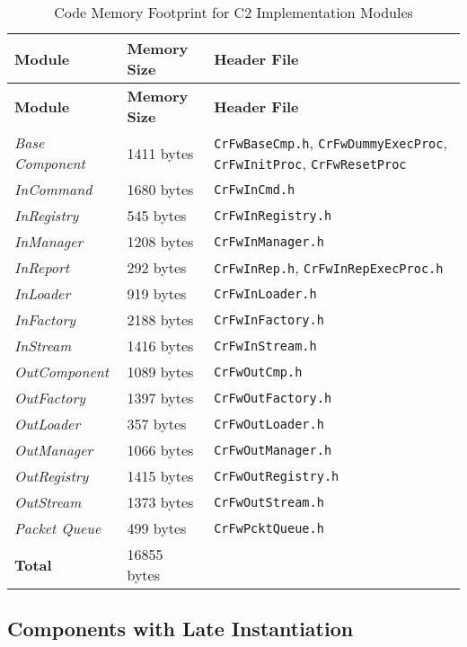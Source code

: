 \documentclass{pnp_article}
\begin{document}
\begin{longtable}{|p{2.7cm}|p{2.7cm}|p{4.7cm}|}
\caption{Code Memory Footprint for C2 Implementation Modules} \label{tab:memFootprint}\\
\rowcolor{light-gray}
\textbf{Module} & \textbf{Memory Size} & \textbf{Header File} \\
\hline\hline
\endfirsthead
\rowcolor{light-gray}
\textbf{Module} & \textbf{Memory Size} & \textbf{Header File} \\
\hline\hline
\endhead
\emph{Base Component} & 1411 bytes & \texttt{CrFwBaseCmp.h}, \texttt{CrFwDummyExecProc}, \texttt{CrFwInitProc}, \texttt{CrFwResetProc} \\
\hline
\emph{InCommand} & 1680 bytes & \texttt{CrFwInCmd.h} \\
\hline
\emph{InRegistry} & 545 bytes & \texttt{CrFwInRegistry.h} \\
\hline
\emph{InManager} & 1208 bytes & \texttt{CrFwInManager.h} \\
\hline
\emph{InReport} & 292 bytes & \texttt{CrFwInRep.h}, \texttt{CrFwInRepExecProc.h} \\
\hline
\emph{InLoader} & 919 bytes & \texttt{CrFwInLoader.h} \\
\hline
\emph{InFactory} & 2188 bytes & \texttt{CrFwInFactory.h} \\
\hline
\emph{InStream} & 1416 bytes & \texttt{CrFwInStream.h} \\
\hline
\emph{OutComponent} & 1089 bytes & \texttt{CrFwOutCmp.h} \\
\hline
\emph{OutFactory} & 1397 bytes & \texttt{CrFwOutFactory.h} \\
\hline
\emph{OutLoader} & 357 bytes & \texttt{CrFwOutLoader.h} \\
\hline
\emph{OutManager} & 1066 bytes & \texttt{CrFwOutManager.h} \\
\hline
\emph{OutRegistry} & 1415 bytes & \texttt{CrFwOutRegistry.h} \\
\hline
\emph{OutStream} & 1373 bytes & \texttt{CrFwOutStream.h} \\
\hline
\emph{Packet Queue} & 499 bytes & \texttt{CrFwPcktQueue.h} \\
\hline
\textbf{Total} & 16855 bytes &  \\
\hline
\end{longtable}

\subsection{Components with Late Instantiation}
\end{document}
